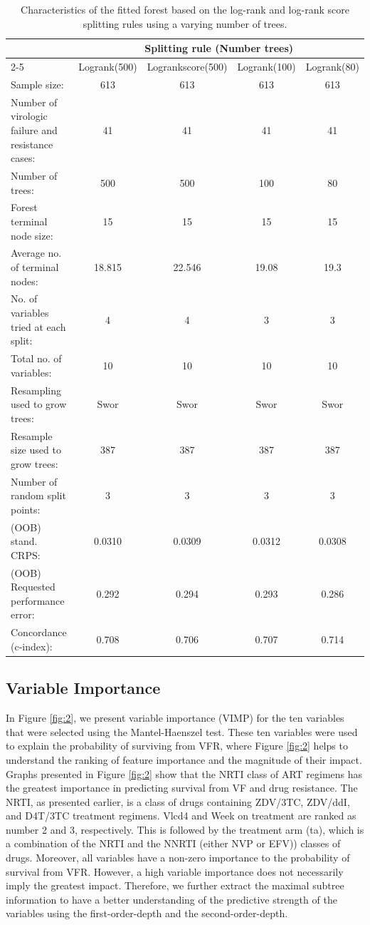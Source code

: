 \documentclass[10pt]{NSP1}
\begin{document}
\begin{table}[t]
\centering
\caption{Characteristics of the fitted forest based on the log-rank and log-rank score splitting rules using a varying number of trees.}
\label{tab:table4}
\begin{tabular}{|p{5.5cm}|c|c|c|c|}
\hline
\multicolumn{1}{|c|}{} & \multicolumn{4}{|c|}{Splitting rule (Number trees)} \\
\cline{2-5}
\multicolumn{1}{|c|}{} & Logrank(500) & Logrankscore(500) & Logrank(100) & Logrank(80) \\
\hline
Sample size: & 613 & 613 & 613 & 613 \\
Number of virologic failure and resistance cases: & 41 & 41 & 41 & 41 \\
Number of trees: & 500 & 500 & 100 & 80 \\
Forest terminal node size: & 15 & 15 & 15 & 15 \\
Average no. of terminal nodes: & 18.815 & 22.546 & 19.08 & 19.3 \\
No. of variables tried at each split: & 4 & 4 & 3 & 3 \\
Total no. of variables: & 10 & 10 & 10 & 10 \\
Resampling used to grow trees: & Swor & Swor & Swor & Swor \\
Resample size used to grow trees: & 387 & 387 & 387 & 387 \\
Number of random split points: & 3 & 3 & 3 & 3 \\
(OOB) stand. CRPS: & 0.0310 & 0.0309 & 0.0312 & 0.0308 \\
(OOB) Requested performance error: & 0.292 & 0.294 & 0.293 & 0.286 \\
Concordance (c-index): & 0.708 & 0.706 & 0.707 & 0.714 \\
\hline
\end{tabular}
\end{table}

\subsection{Variable Importance}
In Figure \ref{fig:2}, we present variable importance (VIMP) for the ten variables that were selected using the Mantel-Haenszel test. These ten variables were used to explain the probability of surviving from VFR, where Figure \ref{fig:2} helps to understand the ranking of feature importance and the magnitude of their impact. Graphs presented in Figure \ref{fig:2} show that the NRTI class of ART regimens has the greatest importance in predicting survival from VF and drug resistance. The NRTI, as presented earlier, is a class of drugs containing ZDV/3TC, ZDV/ddI, and D4T/3TC treatment regimens. Vlcd4 and Week on treatment are ranked as number 2 and 3, respectively. This is followed by the treatment arm (ta), which is a combination of the NRTI and the NNRTI (either NVP or EFV)) classes of drugs. Moreover, all variables have a non-zero importance to the probability of survival from VFR. However, a high variable importance does not necessarily imply the greatest impact. Therefore, we further extract the maximal subtree information to have a better understanding of the predictive strength of the variables using the first-order-depth and the second-order-depth.
\end{document}
